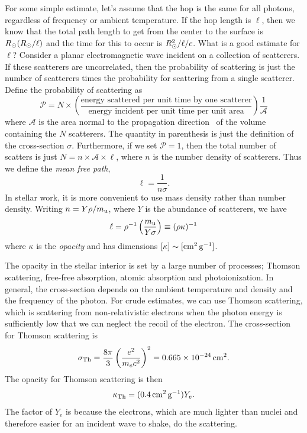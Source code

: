 For some simple estimate, let's assume that the hop is the same for all photons, regardless of frequency or ambient temperature. If the hop length is $\ell$, then we know that the total path length to get from the center to the surface is $R_{\odot}(R_{\odot}/\ell)$ and the time for this to occur is $R_{\odot}^{2}/\ell/c$. What is a good estimate for $\ell$?  Consider a planar electromagnetic wave incident on a collection of scatterers. If these scatterers are uncorrelated, then the probability of scattering is just the number of scatterers times the probability for scattering from a single scatterer.  Define the probability of scattering as
\begin{equation}\label{e.scattering-probability}
\mathcal{P} = N\times\left(\frac{\textrm{energy scattered per unit time by one scatterer}}{\textrm{energy incident per unit time per unit area}}\right)\frac{1}{ \mathcal{A}}
\end{equation}
where $\mathcal{A}$ is the area normal to the propagation direction \unitk\ of the volume containing the $N$ scatterers.  The quantity in parenthesis is just the definition of the cross-section $\sigma$. Furthermore, if we set $\mathcal{P} = 1$, then the total number of scatters is just $N = n\times \mathcal{A}\times \ell$, where $n$ is the number density of scatterers. Thus we define the \emph{mean free path},
\begin{equation}\label{e.mean-free-path}
\ell = \frac{1}{n\sigma}.
\end{equation}
In stellar work, it is more convenient to use mass density rather than number density.  Writing $n = Y\rho/m_\mathrm{u}$, where $Y$ is the abundance of scatterers, we have
\[ \ell = \rho^{-1} \left(\frac{m_\mathrm{u}}{Y\sigma}\right) \equiv (\rho\kappa)^{-1} \]
where $\kappa$ is the \emph{opacity} and has dimensions $[\kappa]\sim[\mathrm{c}\mathrm{m}^{2}\,\mathrm{g}^{-1}]$.

The opacity in the stellar interior is set by a large number of processes; Thomson scattering, free-free absorption, atomic absorption and photoionization.  In general, the cross-section depends on the ambient temperature and density and the frequency of the photon. For crude estimates, we can use Thomson scattering, which is scattering from non-relativistic electrons when the photon energy is sufficiently low that we can neglect the recoil of the electron.  The cross-section for Thomson scattering is 
\begin{equation}\label{e.Thomson-cross-section}
\sigma_{\mathrm{Th}} = \frac{8\pi}{3}\left(\frac{e^{2}}{m_{e}c^{2}}\right)^{2} = 0.665 \times 10^{-24} \,\mathrm{c}\mathrm{m}^{2}.
\end{equation}
The opacity for Thomson scattering is then
\[ \kappa_{\mathrm{Th}} = (0.4\,\mathrm{c}\mathrm{m}^{2}\,\mathrm{g}^{-1}) Y_{e}. \]
The factor of $Y_{e}$ is because the electrons, which are much lighter than nuclei and therefore easier for an incident wave to shake, do the scattering.

